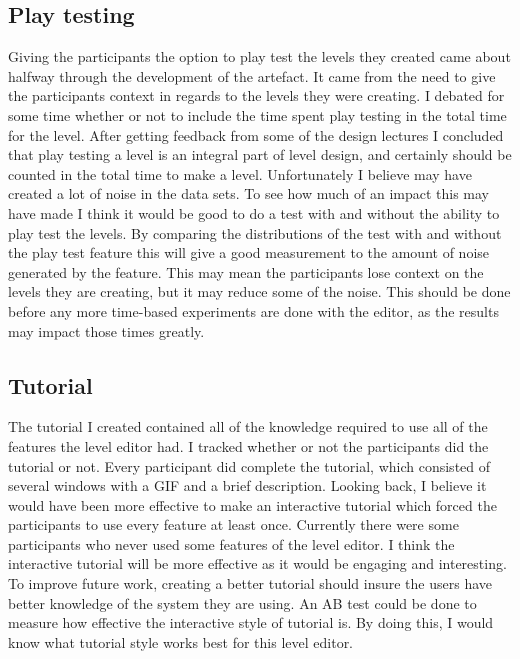 \documentclass[journal]{IEEEtran}
\begin{document}
\subsection{Play testing}\label{ptest}
Giving the participants the option to play test the levels they created came about halfway through the development of the artefact. It came from the need to give the participants context in regards to the levels they were creating. I debated for some time whether or not to include the time spent play testing in the total time for the level. After getting feedback from some of the design lectures I concluded that play testing a level is an integral part of level design, and certainly should be counted in the total time to make a level. Unfortunately I believe may have created a lot of noise in the data sets. To see how much of an impact this may have made I think it would be good to do a test with and without the ability to play test the levels. By comparing the distributions of the test with and without the play test feature this will give a good measurement to the amount of noise generated by the feature. This may mean the participants lose context on the levels they are creating, but it may reduce some of the noise. This should be done before any more time-based experiments are done with the editor, as the results may impact those times greatly.

\subsection{Tutorial}
The tutorial I created contained all of the knowledge required to use all of the features the level editor had. I tracked whether or not the participants did the tutorial or not. Every participant did complete the tutorial, which consisted of several windows with a GIF and a brief description. Looking back, I believe it would have been more effective to make an interactive tutorial which forced the participants to use every feature at least once. Currently there were some participants who never used some features of the level editor. I think the interactive tutorial will be more effective as it would be engaging and interesting. To improve future work, creating a better tutorial should insure the users have better knowledge of the system they are using. An AB test could be done to measure how effective the interactive style of tutorial is. By doing this, I would know what tutorial style works best for this level editor. 

\end{document}
